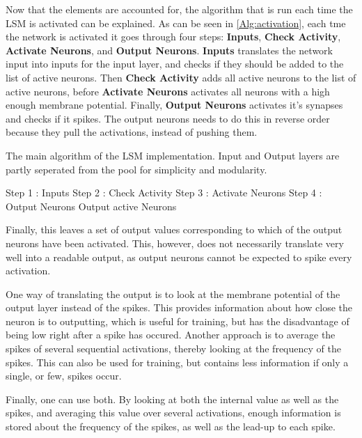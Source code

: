 Now that the elements are accounted for, the algorithm that is run each time the LSM is activated can be explained. As can be seen in \ref{Alg:activation}, each tme the network is activated it goes through four steps: \textbf{Inputs}, \textbf{Check Activity}, \textbf{Activate Neurons}, and \textbf{Output Neurons}. \textbf{Inputs} translates the network input into inputs for the input layer, and checks if they should be added to the list of active neurons. Then \textbf{Check Activity} adds all active neurons to the list of active neurons, before \textbf{Activate Neurons} activates all neurons with a high enough membrane potential. Finally, \textbf{Output Neurons} activates it's synapses and checks if it spikes. The output neurons needs to do this in reverse order because they pull the activations, instead of pushing them.

\begin{algorithm}
\caption{The main algorithm of the LSM implementation. Input and Output layers are partly seperated from the pool for simplicity and modularity.}
\label{Alg:activation}
	Step 1 : Inputs\;
	Step 2 : Check Activity\;
	Step 3 : Activate Neurons\;
	Step 4 : Output Neurons\;
	Output active Neurons\;
\end{algorithm}

Finally, this leaves a set of output values corresponding to which of the output neurons have been activated. This, however, does not necessarily translate very well into a readable output, as output neurons cannot be expected to spike every activation.

One way of translating the output is to look at the membrane potential of the output layer instead of the spikes. This provides information about how close the neuron is to outputting, which is useful for training, but has the disadvantage of being low right after a spike has occured.
Another approach is to average the spikes of several sequential activations, thereby looking at the frequency of the spikes. This can also be used for training, but contains less information if only a single, or few, spikes occur.

Finally, one can use both. By looking at both the internal value as well as the spikes, and averaging this value over several activations, enough information is stored about the frequency of the spikes, as well as the lead-up to each spike.

